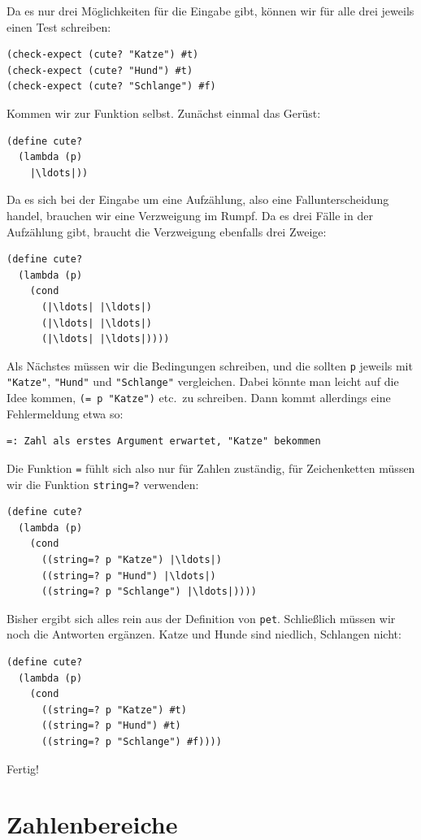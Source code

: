 Da es nur drei Möglichkeiten für die Eingabe gibt, können wir für alle
drei jeweils einen Test schreiben:
%
\begin{lstlisting}
(check-expect (cute? "Katze") #t)
(check-expect (cute? "Hund") #t)
(check-expect (cute? "Schlange") #f)
\end{lstlisting}
%
Kommen wir zur Funktion selbst.  Zunächst einmal das Gerüst:
%
\begin{lstlisting}
(define cute?
  (lambda (p)
    |\ldots|))
\end{lstlisting}
%
Da es sich bei der Eingabe um eine Aufzählung, also eine
Fallunterscheidung handel, brauchen wir eine Verzweigung im Rumpf.  Da
es drei Fälle in der Aufzählung gibt, braucht die Verzweigung
ebenfalls drei Zweige:
%
\begin{lstlisting}
(define cute?
  (lambda (p)
    (cond
      (|\ldots| |\ldots|)
      (|\ldots| |\ldots|)
      (|\ldots| |\ldots|))))
\end{lstlisting}
%
Als Nächstes müssen wir die Bedingungen schreiben, und die sollten
\lstinline{p} jeweils mit \lstinline{"Katze"}, \lstinline{"Hund"} und
\lstinline{"Schlange"} vergleichen.  Dabei könnte man leicht auf die Idee
kommen, \lstinline{(= p "Katze")} etc.\ zu schreiben.  Dann kommt
allerdings eine Fehlermeldung etwa so:
%
\begin{lstlisting}
=: Zahl als erstes Argument erwartet, "Katze" bekommen
\end{lstlisting}
%
Die Funktion \lstinline{=} fühlt sich also nur für Zahlen zuständig, für
Zeichenketten müssen wir die Funktion
\lstinline{string=?} verwenden:
%
\begin{lstlisting}
(define cute?
  (lambda (p)
    (cond
      ((string=? p "Katze") |\ldots|)
      ((string=? p "Hund") |\ldots|)
      ((string=? p "Schlange") |\ldots|))))
\end{lstlisting}
%
Bisher ergibt sich alles rein aus der Definition von \lstinline{pet}.
Schließlich müssen wir noch die Antworten ergänzen.  Katze und Hunde
sind niedlich, Schlangen nicht:
%
\begin{lstlisting}
(define cute?
  (lambda (p)
    (cond
      ((string=? p "Katze") #t)
      ((string=? p "Hund") #t)
      ((string=? p "Schlange") #f))))
\end{lstlisting}
%
Fertig!

\section{Zahlenbereiche}
\label{sec:zahlenbereiche}
\label{sec:heat-water}


